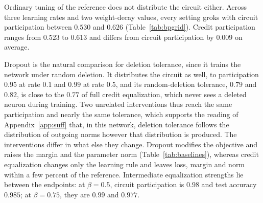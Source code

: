 \documentclass{article} %
\begin{document}
Ordinary tuning of the reference does not distribute the circuit either. Across three learning rates and two weight-decay values, every setting groks with circuit participation between $0.530$ and $0.626$ (Table~\ref{tab:bpgrid}). Credit participation ranges from $0.523$ to $0.613$ and differs from circuit participation by $0.009$ on average.

Dropout is the natural comparison for deletion tolerance, since it trains the network under random deletion. It distributes the circuit as well, to participation $0.95$ at rate $0.1$ and $0.99$ at rate $0.5$, and its random-deletion tolerance, $0.79$ and $0.82$, is close to the $0.77$ of full credit equalization, which never sees a deleted neuron during training. Two unrelated interventions thus reach the same participation and nearly the same tolerance, which supports the reading of Appendix~\ref{app:suff} that, in this network, deletion tolerance follows the distribution of outgoing norms however that distribution is produced. The interventions differ in what else they change. Dropout modifies the objective and raises the margin and the parameter norm (Table~\ref{tab:baselines}), whereas credit equalization changes only the learning rule and leaves loss, margin and norm within a few percent of the reference. Intermediate equalization strengths lie between the endpoints: at $\beta = 0.5$, circuit participation is $0.98$ and test accuracy $0.985$; at $\beta = 0.75$, they are $0.99$ and $0.977$.
\end{document}
